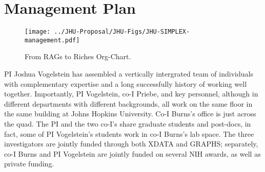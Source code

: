 
\section{Management Plan}






\begin{figure}[h!]
\centering
\texttt{[image: ../JHU-Proposal/JHU-Figs/JHU-SIMPLEX-management.pdf]}
\caption[Orgchart.]{From RAGs to Riches Org-Chart.}
\label{fig:orgchat}
\end{figure}


PI Joshua Vogelstein has assembled a vertically intergrated team of individuals with complementary expertise and a long successfully history of working well together.  Importantly, PI Vogelstein, co-I Priebe, and key personnel, although in different departments with different backgrounds, all work on the same floor in the same building at Johns Hopkins University.  Co-I Burns's office is just across the quad.  The PI and the two co-I's share graduate students and post-docs, in fact, some of PI Vogelstein's students work in co-I Burns's lab space.  The three investigators are jointly funded through both XDATA and GRAPHS; separately, co-I Burns and PI Vogelstein are jointly funded on several NIH awards, as well as private funding.  

